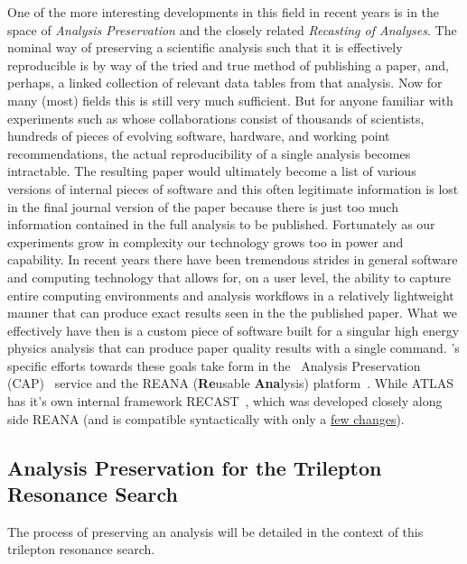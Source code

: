 One of the more interesting developments in this field in recent years is in the space  of \emph{Analysis Preservation} and the closely related \emph{Recasting of Analyses}.
The nominal way of preserving a scientific analysis such that it is effectively reproducible is by way of the tried and true method of publishing a paper, and, perhaps, a linked collection of relevant data tables from that analysis. 
Now for many (most) fields this is still very much sufficient.
But for anyone familiar with experiments such as \ATLAS whose collaborations consist of thousands of scientists, hundreds of pieces of evolving software, hardware, and working point recommendations, the actual reproducibility of a single analysis becomes intractable.
The resulting paper would ultimately become a list of various versions of internal pieces of software and this often legitimate information is lost in the final journal version of the paper because there is just too much information contained in the full analysis to be published.
Fortunately as our experiments grow in complexity our technology grows too in power and capability.
In recent years there have been tremendous strides in general software and computing technology that allows for, on a user level, the ability to capture entire computing environments and analysis workflows in a relatively lightweight manner that can produce exact results seen in the the published paper.
What we effectively have then is a custom piece of software built for a singular high energy physics analysis that can produce paper quality results with a single command. 
\Cern's specific efforts towards these goals take form in the \CERN ~Analysis Preservation (CAP)~\cite{CAP:2021} service and the REANA (\textbf{Re}usable \textbf{Ana}lysis) platform~\cite{reana:2021}.
While ATLAS has it's own internal framework RECAST~\cite{recast:2021}, which was developed closely along side REANA (and is compatible syntactically with only a \href{https://recast-docs.web.cern.ch/recast-docs/using/#set-up-environment-variables-to-access-reanacernch-cluster}{few changes}).

\subsection{Analysis Preservation for the Trilepton Resonance Search}
The process of preserving an analysis will be detailed in the context of this trilepton resonance search.

